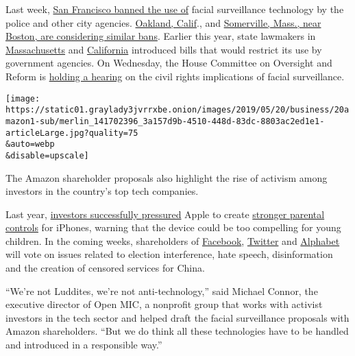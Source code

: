 Last week,
\href{https://www.nytimes3xbfgragh.onion/2019/05/14/us/facial-recognition-ban-san-francisco.html}{San
Francisco banned the use of} facial surveillance technology by the
police and other city agencies.
\href{https://www.sfchronicle.com/bayarea/article/Oakland-considers-banning-facial-recognition-13826426.php}{Oakland,
Calif}., and
\href{https://www.aclum.org/en/news/somerville-becomes-first-east-coast-community-consider-ban-face-recognition}{Somerville,
Mass., near Boston, are considering similar bans}. Earlier this year,
state lawmakers in
\href{https://malegislature.gov/Bills/191/SD671}{Massachusetts} and
\href{https://leginfo.legislature.ca.gov/faces/billTextClient.xhtml?bill_id=201920200AB1215}{California}
introduced bills that would restrict its use by government agencies. On
Wednesday, the House Committee on Oversight and Reform is
\href{https://oversight.house.gov/legislation/hearings/facial-recognition-technology-part-1-its-impact-on-our-civil-rights-and}{holding
a hearing} on the civil rights implications of facial surveillance.

\texttt{[image: https://static01.graylady3jvrrxbe.onion/images/2019/05/20/business/20amazon1-sub/merlin\_141702396\_3a157d9b-4510-448d-83dc-8803ac2ed1e1-articleLarge.jpg?quality=75\\\&auto=webp\\\&disable=upscale]}

The Amazon shareholder proposals also highlight the rise of activism
among investors in the country's top tech companies.

Last year,
\href{https://www.nytimes3xbfgragh.onion/2018/01/08/business/apple-investors-children.html}{investors
successfully pressured} Apple to create
\href{https://techcrunch.com/2018/06/04/apple-unveils-new-screen-time-controls-for-children/}{stronger
parental controls} for iPhones, warning that the device could be too
compelling for young children. In the coming weeks, shareholders of
\href{http://d18rn0p25nwr6d.cloudfront.net/CIK-0001326801/ffdb441a-71d1-4bd0-9d7b-c1583143b218.pdf}{Facebook},
\href{https://s22.q4cdn.com/826641620/files/doc_financials/proxy/2019/Proxy2019.pdf}{Twitter}
and
\href{https://www.sec.gov/Archives/edgar/data/1652044/000130817919000205/lgoog2019_def14a.htm}{Alphabet}
will vote on issues related to election interference, hate speech,
disinformation and the creation of censored services for China.

``We're not Luddites, we're not anti-technology,'' said Michael Connor,
the executive director of Open MIC, a nonprofit group that works with
activist investors in the tech sector and helped draft the facial
surveillance proposals with Amazon shareholders. ``But we do think all
these technologies have to be handled and introduced in a responsible
way.''

